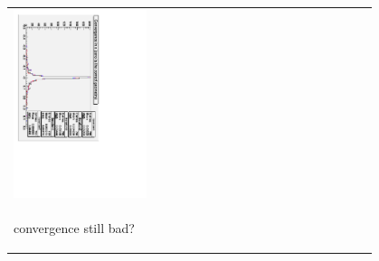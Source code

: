 \documentclass[compress]{beamer}
\begin{document}
\begin{frame}
\begin{center}
\begin{tabular}{p{0.4\linewidth} c p{0.4\linewidth}}
\begin{minipage}{\linewidth}
      \includegraphics[height=\linewidth, angle=90]{xconvergence_still_looks_bad_hist.pdf}
  \end{minipage} \\
  \begin{minipage}{\linewidth}
    \begin{center}
      convergence still bad?
    \end{center}
  \end{minipage} & &
  \begin{minipage}{\linewidth}
    \begin{center}

    \end{center}
  \end{minipage}
\end{tabular}
\end{center}
\end{frame}
\end{document}
